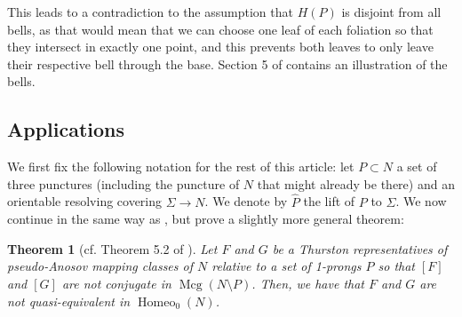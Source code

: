 \documentclass[a4paper]{article}
\newtheorem{theorem}{Theorem}[section]
\begin{document}
This leads to a contradiction to the assumption that $H(P)$ is disjoint from all bells, as that would mean that we can choose one leaf of each foliation so that they intersect in exactly one point, and this prevents both leaves to only leave their respective bell through the base.
Section 5 of \cite{BHW2} contains an illustration of the bells.

\subsection{Applications}
We first fix the following notation for the rest of this article:
let $P\subset N$ a set of three punctures (including the puncture of $N$ that might already be there) and an orientable resolving covering $\Sigma\rightarrow N$.
We denote by $\hat{P}$ the lift of $P$ to $\Sigma$.
We now continue in the same way as \cite{BHW2}, but prove a slightly more general theorem:

\begin{theorem}[cf. Theorem 5.2 of \cite{BHW2}]\label{thm:main-thing}
    Let $F$ and $G$ be a Thurston representatives of pseudo-Anosov mapping classes of $N$ relative to a set of 1-prongs $P$ so that $[F]$ and $[G]$ are not conjugate in $\operatorname{Mcg}(N\setminus P)$.
    Then, we have that $F$ and $G$ are not quasi-equivalent in $\operatorname{Homeo}_0(N)$.
\end{theorem}
\end{document}
